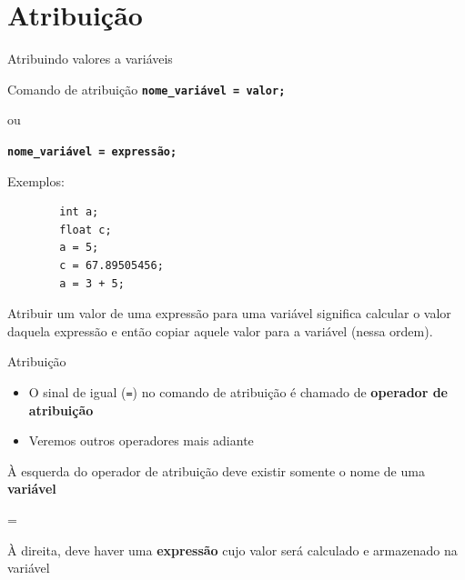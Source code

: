 \documentclass[handout]{beamer}
\begin{document}
\section{Atribuição}

\begin{frame}[fragile]{Atribuindo valores a variáveis}

    \begin{block}{Comando de atribuição}
        \texttt{\textbf{nome\_variável = valor;}}

        ou

        \texttt{\textbf{nome\_variável = expressão;}}
    \end{block}

    \pause
    Exemplos:
    \begin{verbatim}
        int a;
        float c;
        a = 5;
        c = 67.89505456;
        a = 3 + 5;
    \end{verbatim}

    \pause
    Atribuir um valor de uma expressão para uma variável significa calcular o valor daquela expressão e então copiar aquele valor para a variável (nessa ordem).
\end{frame}

\begin{frame}{Atribuição}

    \begin{itemize}
        \item O sinal de igual (\texttt{=}) no comando de atribuição é chamado de {\bf operador de atribuição}
        \pause
        \item Veremos outros operadores mais adiante
    \end{itemize}

    \bigskip
    
    \pause
    \begin{minipage}{0.4\textwidth}
        À esquerda do operador de atribuição deve existir somente o nome de uma \textbf{variável}
    \end{minipage}
    \hfill = \hfill
    \pause
    \begin{minipage}{0.4\textwidth}
        À direita, deve haver uma \textbf{expressão} cujo valor será calculado e armazenado na variável
    \end{minipage}
\end{frame}
\end{document}
